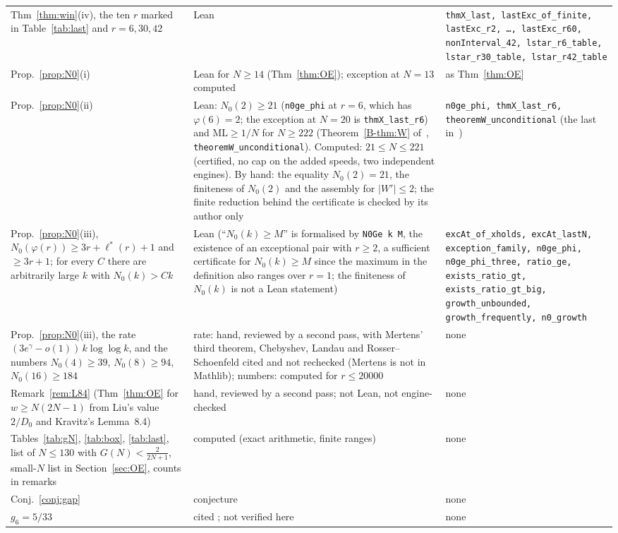 \documentclass[11pt]{article}
\theoremstyle{definition}
\theoremstyle{remark}
\newcommand{\ML}{\mathrm{ML}}
\newcommand{\xC}[1]{\ref{B-#1}}
\begin{document}
{\begin{longtable}{@{}p{}p{}p{}@{}}
Thm~\ref{thm:win}(iv), the ten $r$ marked in Table~\ref{tab:last} and $r=6,30,42$ & Lean & \texttt{thmX\_last, lastExc\_of\_finite, lastExc\_r2, \dots, lastExc\_r60, nonInterval\_42, lstar\_r6\_table, lstar\_r30\_table, lstar\_r42\_table} \\
Prop.~\ref{prop:N0}(i) & Lean for $N\ge14$ (Thm~\ref{thm:OE}); exception at $N=13$ computed & as Thm~\ref{thm:OE} \\
Prop.~\ref{prop:N0}(ii) & Lean: $N_0(2)\ge21$ (\texttt{n0ge\_phi} at $r=6$, which has $\varphi(6)=2$; the exception at $N=20$ is \texttt{thmX\_last\_r6}) and $\ML\ge1/N$ for $N\ge222$ (Theorem~\xC{thm:W} of~\cite{B}, \texttt{theoremW\_unconditional}). Computed: $21\le N\le221$ (certified, no cap on the added speeds, two independent engines). By hand: the equality $N_0(2)=21$, the finiteness of $N_0(2)$ and the assembly for $|W'|\le2$; the finite reduction behind the certificate is checked by its author only & \texttt{n0ge\_phi, thmX\_last\_r6, theoremW\_unconditional} (the last in~\cite{B}) \\
Prop.~\ref{prop:N0}(iii), $N_0(\varphi(r))\ge3r+\ell^*(r)+1$ and $\ge3r+1$; for every $C$ there are arbitrarily large $k$ with $N_0(k)>Ck$ & Lean (``$N_0(k)\ge M$'' is formalised by \texttt{N0Ge k M}, the existence of an exceptional pair with $r\ge2$, a sufficient certificate for $N_0(k)\ge M$ since the maximum in the definition also ranges over $r=1$; the finiteness of $N_0(k)$ is not a Lean statement) & \texttt{excAt\_of\_xholds, excAt\_lastN, exception\_family, n0ge\_phi, n0ge\_phi\_three, ratio\_ge, exists\_ratio\_gt, exists\_ratio\_gt\_big, growth\_unbounded, growth\_frequently, n0\_growth} \\
Prop.~\ref{prop:N0}(iii), the rate $(3e^{\gamma}-o(1))\,k\log\log k$, and the numbers $N_0(4)\ge39$, $N_0(8)\ge94$, $N_0(16)\ge184$ & rate: hand, reviewed by a second pass, with Mertens' third theorem, Chebyshev, Landau and Rosser--Schoenfeld cited and not rechecked (Mertens is not in Mathlib); numbers: computed for $r\le20000$ & none \\
Remark~\ref{rem:L84} (Thm~\ref{thm:OE} for $w\ge N(2N-1)$ from Liu's value $2/D_0$ and Kravitz's Lemma~8.4) & hand, reviewed by a second pass; not Lean, not engine-checked & none \\
Tables~\ref{tab:gN}, \ref{tab:box}, \ref{tab:last}, list of $N\le130$ with $G(N)<\frac2{2N+1}$, small-$N$ list in Section~\ref{sec:OE}, counts in remarks & computed (exact arithmetic, finite ranges) & none \\
Conj.~\ref{conj:gap} & conjecture & none \\
$g_6=5/33$ & cited \cite{C}; not verified here & none \\
\end{longtable}
}
\end{document}
